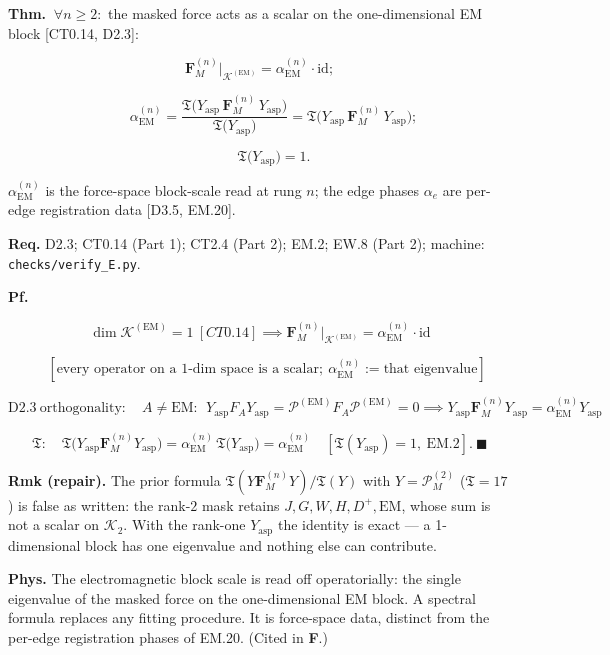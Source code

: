 \begin{theorem}\label{tag:EM-17}
\textbf{Thm.} $\ \forall n\ge2:$ the masked force acts as a scalar on the one-dimensional EM block [CT0.14, D2.3]:

\[
\mathbf F_M^{(n)}\big|_{\mathcal K^{(\mathrm{EM})}}=\alpha_{\mathrm{EM}}^{(n)}\cdot\mathrm{id};
\]

\[
\qquad \alpha_{\mathrm{EM}}^{(n)}=\frac{\mathfrak T\bigl(Y_{\mathrm{asp}}\,\mathbf F_M^{(n)}\,Y_{\mathrm{asp}}\bigr)}{\mathfrak T\bigl(Y_{\mathrm{asp}}\bigr)}=\mathfrak T\bigl(Y_{\mathrm{asp}}\,\mathbf F_M^{(n)}\,Y_{\mathrm{asp}}\bigr);
\]

\[
\qquad \mathfrak T\bigl(Y_{\mathrm{asp}}\bigr)=1.
\]

$\alpha_{\mathrm{EM}}^{(n)}$ is the force-space block-scale read at rung $n$; the edge phases $\alpha_e$ are per-edge registration data [D3.5, EM.20].

\textbf{Req.} D2.3; CT0.14 (Part 1); CT2.4 (Part 2); EM.2; EW.8 (Part 2); machine: \texttt{checks/\allowbreak{}verify\_\allowbreak{}E.py}.

\textbf{Pf.}

\[
\dim\mathcal K^{(\mathrm{EM})}=1\ [CT0.14]\implies\mathbf F_M^{(n)}\big|_{\mathcal K^{(\mathrm{EM})}}=\alpha_{\mathrm{EM}}^{(n)}\cdot\mathrm{id}
\]

\[
\quad [\text{every operator on a 1-dim space is a scalar};\ \alpha_{\mathrm{EM}}^{(n)}:=\text{that eigenvalue}]
\]

\[
\mathrm{D2.3}\ \text{orthogonality}:\quad A\ne\mathrm{EM}:\ \ Y_{\mathrm{asp}}F_AY_{\mathrm{asp}}=\mathcal P^{(\mathrm{EM})}F_A\mathcal P^{(\mathrm{EM})}=0\implies Y_{\mathrm{asp}}\mathbf F_M^{(n)}Y_{\mathrm{asp}}=\alpha_{\mathrm{EM}}^{(n)}Y_{\mathrm{asp}}
\]

\[
\mathfrak T:\quad\mathfrak T\bigl(Y_{\mathrm{asp}}\mathbf F_M^{(n)}Y_{\mathrm{asp}}\bigr)=\alpha_{\mathrm{EM}}^{(n)}\,\mathfrak T\bigl(Y_{\mathrm{asp}}\bigr)=\alpha_{\mathrm{EM}}^{(n)}\quad[\mathfrak T(Y_{\mathrm{asp}})=1,\ \mathrm{EM.2}].\ \blacksquare
\]

\textbf{Rmk (repair).} The prior formula $\mathfrak T(Y\mathbf F_M^{(n)}Y)/\mathfrak T(Y)$ with $Y=\mathcal P_M^{(2)}$ ($\mathfrak T=17$) is false as written: the rank-$2$ mask retains $J,G,W,H,D^+,\mathrm{EM}$, whose sum is not a scalar on $\mathcal K_2$. With the rank-one $Y_{\mathrm{asp}}$ the identity is exact — a 1-dimensional block has one eigenvalue and nothing else can contribute.

\textbf{Phys.} The electromagnetic block scale is read off operatorially: the single eigenvalue of the masked force on the one-dimensional EM block. A spectral formula replaces any fitting procedure. It is force-space data, distinct from the per-edge registration phases of EM.20. (Cited in \textbf{F}.)

\end{theorem}

